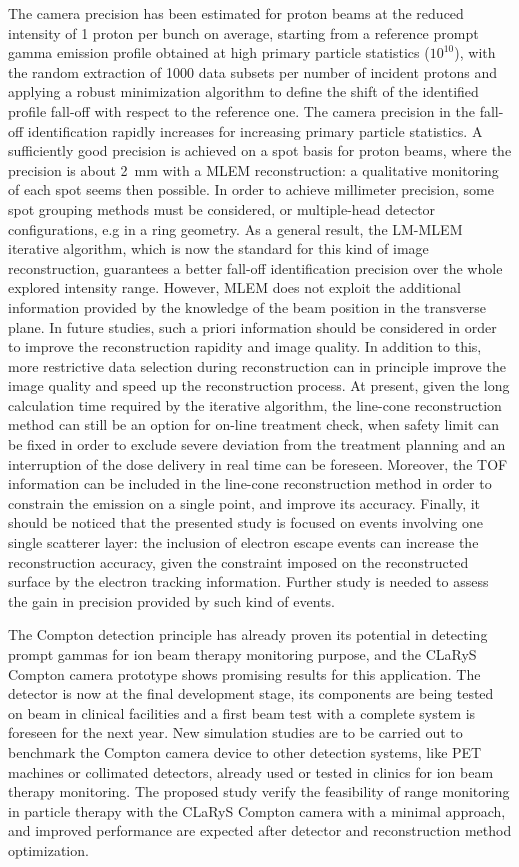 The camera precision has been estimated for proton beams at the reduced intensity of 1 proton per bunch on average, starting from a reference prompt gamma emission profile obtained at high primary particle statistics ($10^{10}$), with the random extraction of 1000 data subsets per number of incident protons and applying a robust minimization algorithm to define the shift of the identified profile fall-off with respect to the reference one.
The camera precision in the fall-off identification rapidly increases for increasing primary particle statistics. A sufficiently good precision is achieved on a spot basis for proton beams, where the precision is about 2~mm with a MLEM reconstruction: a qualitative monitoring of each spot seems then possible. In order to achieve millimeter precision, some spot grouping methods must be considered, or multiple-head detector configurations, e.g in a ring geometry. As a general result, the LM-MLEM iterative algorithm, which is now the standard for this kind of image reconstruction,  guarantees a better fall-off identification precision over the whole explored intensity range. However, MLEM does not exploit the additional information provided by the knowledge of the beam position in the transverse plane. In future studies, such a priori information should be considered in order to improve the reconstruction rapidity and image quality. In addition to this, more restrictive data selection during reconstruction can in principle improve the image quality and speed up the reconstruction process. At present, given the long calculation time required by the iterative algorithm, the line-cone reconstruction method can still be an option for on-line treatment check, when safety limit can be fixed in order to exclude severe deviation from the treatment planning and an interruption of the dose delivery in real time can be foreseen. Moreover, the TOF information can be included in the line-cone reconstruction method in order to constrain the emission on a single point, and improve its accuracy.
Finally, it should be noticed that the presented study is focused on events involving one single scatterer layer: the inclusion of electron escape events can increase the reconstruction accuracy, given the constraint imposed on the reconstructed surface by the electron tracking information. Further study is needed to assess the gain in precision provided by such kind of events. 

The Compton detection principle has already proven its potential in detecting prompt gammas for ion beam therapy monitoring purpose, and the CLaRyS Compton camera prototype shows promising results for this application. The detector is now at the final development stage, its components are being tested on beam in clinical facilities and a first beam test with a complete system is foreseen for the next year. New simulation studies are to be carried out to benchmark the Compton camera device to other detection systems, like PET machines or collimated detectors, already used or tested in clinics for ion beam therapy monitoring. The proposed study verify the feasibility of range monitoring in particle therapy with the CLaRyS Compton camera with a minimal approach, and improved performance are expected after detector and reconstruction method optimization.           


